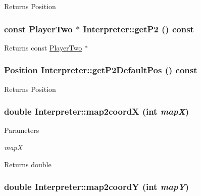\label{classInterpreter_a2b46c460756f87d2dcef4ea8d8d49aaa}
\begin{DoxyReturn}{Returns}
Position 
\end{DoxyReturn}
\hypertarget{classInterpreter_aa34b7799a25a0174b82690d09ce065f1}{
\subsubsection[{getP2}]{\setlength{\rightskip}{0pt plus 5cm}const {\bf PlayerTwo} $\ast$ Interpreter::getP2 () const}}
\label{classInterpreter_aa34b7799a25a0174b82690d09ce065f1}
\begin{DoxyReturn}{Returns}
const \hyperlink{classPlayerTwo}{PlayerTwo} $\ast$ 
\end{DoxyReturn}
\hypertarget{classInterpreter_ade297117d2ee20f524dd184ddd152c6d}{
\subsubsection[{getP2DefaultPos}]{\setlength{\rightskip}{0pt plus 5cm}Position Interpreter::getP2DefaultPos () const}}
\label{classInterpreter_ade297117d2ee20f524dd184ddd152c6d}
\begin{DoxyReturn}{Returns}
Position 
\end{DoxyReturn}
\hypertarget{classInterpreter_afaaf3930191f9ba3e48a09af193e0a39}{
\subsubsection[{map2coordX}]{\setlength{\rightskip}{0pt plus 5cm}double Interpreter::map2coordX (int {\em mapX})}}
\label{classInterpreter_afaaf3930191f9ba3e48a09af193e0a39}

\begin{DoxyParams}{Parameters}
\item[{\em mapX}]\end{DoxyParams}
\begin{DoxyReturn}{Returns}
double 
\end{DoxyReturn}
\hypertarget{classInterpreter_abd0885c42ade8eb7f941c8d4b26a2501}{
\subsubsection[{map2coordY}]{\setlength{\rightskip}{0pt plus 5cm}double Interpreter::map2coordY (int {\em mapY})}}
\label{classInterpreter_abd0885c42ade8eb7f941c8d4b26a2501}

